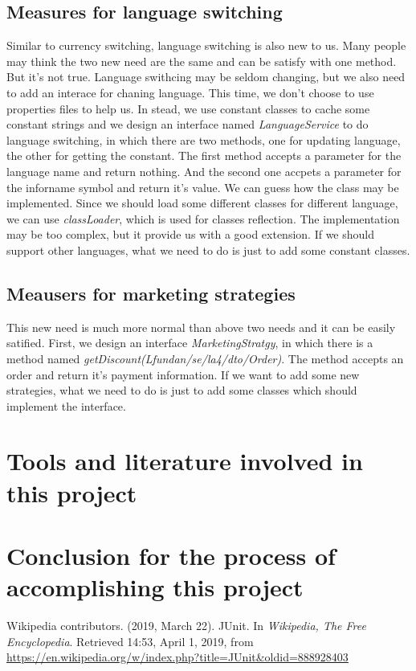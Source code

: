 \documentclass[a4paper]{report}
\begin{document}
\section{Measures for language switching}
\par Similar to currency switching, language switching is also new to us. Many people may think the two new need are the same and can be satisfy with one method. But it's not true. Language swithcing may be seldom changing, but we also need to add an interace for chaning language. This time, we don't choose to use properties files to help us. In stead, we use constant classes to cache some constant strings and we design an interface named \emph{LanguageService} to do language switching, in which there are two methods, one for updating language, the other for getting the constant. The first method accepts a parameter for the language name and return nothing. And the second one accpets a parameter for the inforname symbol and return it's value. We can guess how the class may be implemented. Since we should load some different classes for different language, we can use \emph{classLoader}, which is used for classes reflection. The implementation may be too complex, but it provide us with a good extension. If we should support other languages, what we need to do is just to add some constant classes.
\section{Meausers for marketing strategies}
\par This new need is much more normal than above two needs and it can be easily satified. First, we design an interface \emph{MarketingStratgy}, in which there is a method named \emph{getDiscount(Lfundan/se/la4/dto/Order)}. The method accepts an order and return it's payment information. If we want to add some new strategies, what we need to do is just to add some classes which should implement the interface.

\chapter{Tools and literature involved in this project}



\chapter{Conclusion for the process of accomplishing this project}


\begin{thebibliography}{A}


Wikipedia contributors. (2019, March 22). JUnit. In \emph{Wikipedia, The Free Encyclopedia}. Retrieved 14:53, April 1, 2019, from \url{https://en.wikipedia.org/w/index.php?title=JUnit&oldid=888928403}

\end{thebibliography}
\end{document}
